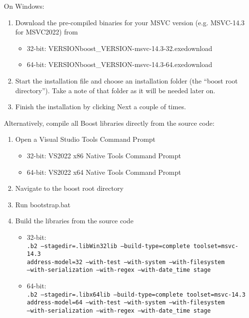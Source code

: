 \medskip
On Windows:
\begin{enumerate}
\item Download the pre-compiled binaries for your MSVC version (e.g. MSVC-14.3 for MSVC2022) from \cite{boost-binaries}
\begin{itemize}
\item 32-bit: \cite{boost-binaries}{\bs}VERSION{\bs}boost\_VERSION-msvc-14.3-32.exe{\bs}download 
\item 64-bit: \cite{boost-binaries}{\bs}VERSION{\bs}boost\_VERSION-msvc-14.3-64.exe{\bs}download
\end{itemize}
\item Start the installation file and choose an installation folder (the ``boost root directory'').
  Take a note of that folder as it will be needed later on.   
\item Finish the installation by clicking Next a couple of times.
\end{enumerate}
    
Alternatively, compile all Boost libraries directly from the source code:
\begin{enumerate}
\item Open a Visual Studio Tools Command Prompt
\begin{itemize}
\item 32-bit: VS2022 x86 Native Tools Command Prompt
\item 64-bit: VS2022 x64 Native Tools Command Prompt
\end{itemize}
\item Navigate to the boost root directory
\item Run bootstrap.bat
\item Build the libraries from the source code
\begin{itemize}
\item 32-bit: \\
  {\footnotesize\tt .{\bs}b2 --stagedir=.{\bs}lib{\bs}Win32{\bs}lib --build-type=complete toolset=msvc-14.3 \bs \\
    address-model=32 --with-test --with-system --with-filesystem  \bs \\
    --with-serialization --with-regex --with-date\_time stage}
\item 64-bit: \\
  {\footnotesize\tt .{\bs}b2 --stagedir=.{\bs}lib{\bs}x64{\bs}lib --build-type=complete toolset=msvc-14.3 \bs \\
    address-model=64 --with-test --with-system --with-filesystem \bs \\
    --with-serialization --with-regex --with-date\_time stage}
\end{itemize}
\end{enumerate}

